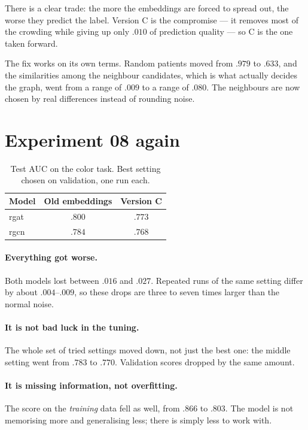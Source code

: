 \documentclass[11pt]{article}
\begin{document}
There is a clear trade: the more the embeddings are forced to spread out, the worse they
predict the label. Version C is the compromise --- it removes most of the crowding while
giving up only $.010$ of prediction quality --- so C is the one taken forward.

The fix works on its own terms. Random patients moved from $.979$ to $.633$, and the
similarities among the neighbour candidates, which is what actually decides the graph, went
from a range of $.009$ to a range of $.080$. The neighbours are now chosen by real
differences instead of rounding noise.

\section*{Experiment 08 again}

\begin{table}[h]
\centering
\begin{tabularx}{\textwidth}{Xcc}
\toprule
Model & Old embeddings & Version C \\
\midrule
rgat & $\mathbf{.800}$ & $.773$ \\
rgcn & $.784$ & $.768$ \\
\bottomrule
\end{tabularx}
\caption{Test AUC on the color task. Best setting chosen on validation, one run each.}
\end{table}

\paragraph{Everything got worse.} Both models lost between $.016$ and $.027$. Repeated runs of
the same setting differ by about $.004$--$.009$, so these drops are three to seven times
larger than the normal noise.

\paragraph{It is not bad luck in the tuning.} The whole set of tried settings moved down, not
just the best one: the middle setting went from $.783$ to $.770$. Validation scores dropped
by the same amount.

\paragraph{It is missing information, not overfitting.} The score on the \emph{training} data
fell as well, from $.866$ to $.803$. The model is not memorising more and generalising less;
there is simply less to work with.
\end{document}
